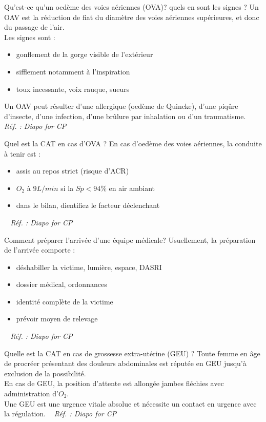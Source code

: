 \documentclass[grid,avery5371,landscape]{flashcards}
\makeatletter
\newcounter{nocarte}
\newcommand{\categ}[1]{%
  \def\@categ{#1}%
  \setcounter{nocarte}{0}%
}
\newcommand{\source}[1]{%
  \medskip
  \itshape%
   ~ \hfill Réf. : #1}
\makeatother
\begin{document}
\color[HTML]{01DF01}
\categ{CE-CP-REG}
\begin{flashcard}[bilan]{
 Qu'est-ce qu'un oedème des voies aériennes (OVA)? quels en sont les signes ?    }
  Un OAV est la réduction de fiat du diamètre des voies aériennes supérieures, et donc du passage de l'air. \\
    Les signes sont :
    \begin{itemize}
        \item gonflement de la gorge visible de l'extérieur
        \item sifflement notamment à l'inspiration
        \item toux incessante, voix rauque, sueurs
    \end{itemize}
    Un OAV peut résulter d'une allergique (oedème de Quincke), d'une piqûre d'insecte, d'une infection, d'une brûlure par inhalation ou d'un traumatisme.
  \source{Diapo for CP}
\end{flashcard}


\color[HTML]{01DF01}
\categ{CE-CP-REG}
\begin{flashcard}[CAT]{
 Quel est la CAT en cas d'OVA ?    }
  En cas d'oedème des voies aériennes, la conduite à tenir est :
    \begin{itemize}
        \item assis au repos strict (risque d'ACR)
        \item $O_2$ à $9L/min$ si la $Sp<94\%$ en air ambiant
        \item dans le bilan, dientifiez le facteur déclenchant
    \end{itemize}
  \source{Diapo for CP}
\end{flashcard}


\color[HTML]{01DF01}
\categ{CE-CP-REG}
\begin{flashcard}[CAT]{
 Comment préparer l'arrivée d'une équipe médicale?    }
  Usuellement, la préparation de l'arrivée comporte : 
    \begin{itemize}
        \item déshabiller la victime, lumière, espace, DASRI
        \item dossier médical, ordonnances
        \item identité complète de la victime
        \item prévoir moyen de relevage
    \end{itemize}
  \source{Diapo for CP}
\end{flashcard}


\color[HTML]{01DF01}
\categ{CE-CP-REG}
\begin{flashcard}[CAT]{
 Quelle est la CAT en cas de grossesse extra-utérine (GEU) ?   }
  Toute femme en âge de procréer présentant des douleurs abdominales est réputée en GEU jusqu'à exclusion de la possibilité. \\
    En cas de GEU, la position d'attente est allongée jambes fléchies avec administration d'$O_2$. \\
    Une GEU est une urgence vitale absolue et nécessite un contact en urgence avec la régulation.
  \source{Diapo for CP}
\end{flashcard}
\end{document}
